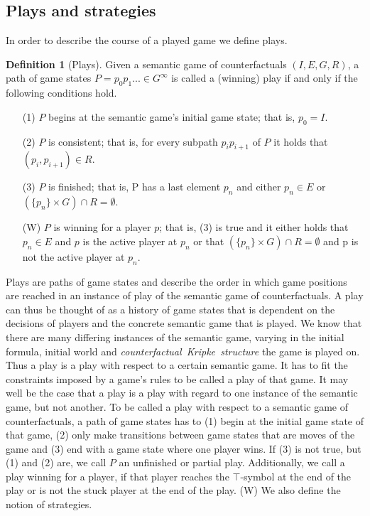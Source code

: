 \documentclass[a4paper,american,10pt]{paper}
\theoremstyle{definition}\newtheorem{lemma}[thm]{Lemma}
\theoremstyle{definition}\newtheorem{proposition}[thm]{Proposition}
\theoremstyle{definition}\newtheorem{corollary}[thm]{Corollary}
\theoremstyle{definition}\newtheorem{definition}{Definition}
\begin{document}
\subsection{Plays and strategies}
In order to describe the course of a played game we define plays.
\begin{definition}[Plays]
Given a semantic game of counterfactuals $(I, E, G, R)$, a path of game states $P=p_0p_1...\in G^{\infty}$ is called a (winning) play if and only if the following conditions hold.
\begin{itemize}
	\item[(1)] $P$ begins at the semantic game's initial game state; that is, $p_0=I$.
	\item[(2)] $P$ is consistent; that is, for every subpath $p_ip_{i+1}$ of $P$ it holds that $(p_{i},p_{i+1})\in R$.
	\item[(3)] $P$ is finished; that is, P has a last element $p_n$ and either $p_n\in E$ or $(\{p_n\}\times G)\cap R = \emptyset$.
	\item[(W)] $P$ is winning for a player $p$; that is, (3) is true and it either holds that $p_n\in E$ and $p$ is the active player at $p_n$ or that $(\{p_n\}\times G)\cap R = \emptyset$ and p is not the active player at $p_n$.
\end{itemize}
\end{definition}
Plays are paths of game states and describe the order in which game positions are reached in an instance of play of the semantic game of counterfactuals. A play can thus be thought of as a history of game states that is dependent on the decisions of players and the concrete semantic game that is played. We know that there are many differing instances of the semantic game, varying in the initial formula, initial world and \textit{counterfactual~Kripke~structure} the game is played on. Thus a play is a play with respect to a certain semantic game. It has to fit the constraints imposed by a game's rules to be called a play of that game. It may well be the case that a play is a play with regard to one instance of the semantic game, but not another. To be called a play with respect to a semantic game of counterfactuals, a path of game states has to (1) begin at the initial game state of that game, (2) only make transitions between game states that are moves of the game and (3) end with a game state where one player wins. If (3) is not true, but (1) and (2) are, we call $P$ an unfinished or partial play. Additionally, we call a play winning for a player, if that player reaches the $\top$-symbol at the end of the play or is not the stuck player at the end of the play. (W) We also define the notion of strategies.
\end{document}

